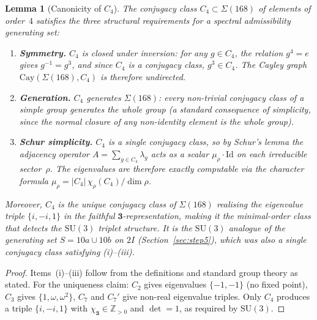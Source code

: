 \documentclass[11pt,a4paper]{article}
\newtheorem{lemma}{Lemma}
\begin{document}
    \begin{lemma}[Canonicity of $C_4$]
      \label{lem:C4-canonical}
      The conjugacy class $C_4 \subset \Sigma(168)$ of elements of order~$4$ satisfies the
      three structural requirements for a spectral admissibility generating set:
      \begin{enumerate}
        \item[(i)] \textbf{Symmetry.}
        $C_4$ is closed under inversion: for any $g \in C_4$, the relation $g^4 = e$ gives
        $g^{-1} = g^3$, and since $C_4$ is a conjugacy class, $g^3 \in C_4$.
        The Cayley graph $\mathrm{Cay}(\Sigma(168), C_4)$ is therefore undirected.
        \item[(ii)] \textbf{Generation.}
        $C_4$ generates $\Sigma(168)$: every non-trivial conjugacy class of a simple group
        generates the whole group (a standard consequence of simplicity, since the normal closure
        of any non-identity element is the whole group).
        \item[(iii)] \textbf{Schur simplicity.}
        $C_4$ is a single conjugacy class, so by Schur's lemma the adjacency operator
        $A = \sum_{g \in C_4} \lambda_g$ acts as a scalar $\mu_\rho \cdot \mathrm{Id}$ on
        each irreducible sector~$\rho$.
        The eigenvalues are therefore exactly computable via the character formula
        $\mu_\rho = |C_4|\,\chi_\rho(C_4)/\dim\rho$.
      \end{enumerate}
      Moreover, $C_4$ is the unique conjugacy class of $\Sigma(168)$ realising the eigenvalue
      triple $\{i,-i,1\}$ in the faithful $\mathbf{3}$-representation, making it the
      minimal-order class that detects the $\mathrm{SU}(3)$ triplet structure.
      It is the $\mathrm{SU}(3)$ analogue of the generating set $S = 10a \cup 10b$ on $2I$
      (Section~\ref{sec:step5}), which was also a single conjugacy class satisfying (i)--(iii).
    \end{lemma}

    \begin{proof}
      Items~(i)--(iii) follow from the definitions and standard group theory as stated.
      For the uniqueness claim: $C_2$ gives eigenvalues $\{-1,-1\}$ (no fixed point), $C_3$
      gives $\{1,\omega,\omega^2\}$, $C_7$ and $C_7'$ give non-real eigenvalue triples.
      Only $C_4$ produces a triple $\{i,-i,1\}$ with $\chi_{\mathbf{3}} \in \mathbb{Z}_{>0}$
      and $\det = 1$, as required by $\mathrm{SU}(3)$.
    \end{proof}
\end{document}
